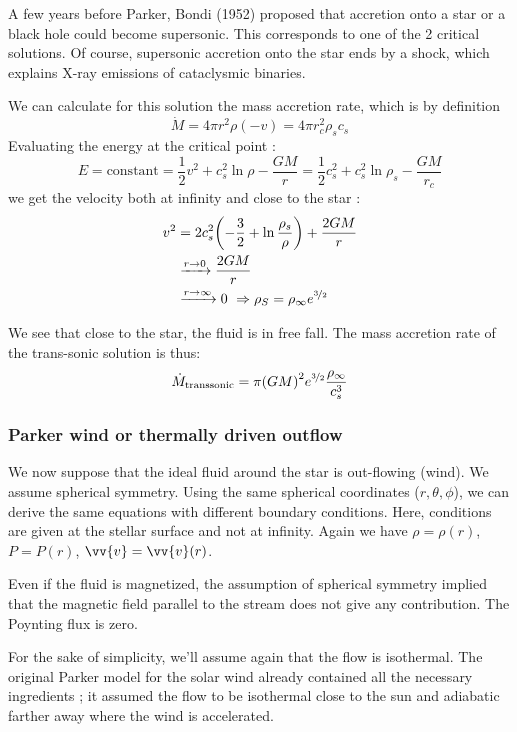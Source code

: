 \documentclass[10pt,a4paper,english]{article}
\let\originalleft\left
\let\originalright\right
\renewcommand{\left}{\mathopen{}\mathclose\bgroup\originalleft}
\renewcommand{\right}{\aftergroup\egroup\originalright}
\begin{document}
A few years before Parker, Bondi (1952) proposed that accretion onto a
star or a black hole could become supersonic. This corresponds to one
of the 2 critical solutions. Of course, supersonic accretion onto the
star ends by a shock, which explains X-ray emissions of cataclysmic
binaries.

We can calculate for this solution the mass accretion rate, which is
by definition
\begin{equation}
  \dot{M} = 4\pi r^2 \rho (-v) = 4\pi r_c^2 \rho_s c_s
\end{equation}
Evaluating the energy at the critical point :
\begin{equation}
  E = \textrm{constant} = \frac{1}{2}v^2 + c_s^2 \ln\rho - \frac{GM}{r} = \frac{1}{2}c_s^2 + c_s^2 \ln \rho_s - \frac{GM}{r_c}
\end{equation}
we get the velocity both at infinity and close to the star :
\begin{align}
  v^2 &= 2c_s^2 \left( -\frac{3}{2} + \ln \frac{\rho_s}{\rho} \right)  + \frac{2GM}{r} \\
      & \xrightarrow{r\to 0} \frac{2GM}{r} \\
      & \xrightarrow{r\to\infty} 0\ \Rightarrow \rho_S = \rho_\infty e^{\nicefrac{3}{2}}
\end{align}

We see that close to the star, the fluid is in free fall. The mass
accretion rate of the trans-sonic solution is thus:
\begin{equation}
  \dot{M}_\mathrm{transsonic} = \pi \left( GM \right)^2 e^{\nicefrac{3}{2}} \frac{\rho_\infty}{c_s^3}
\end{equation}
\subsubsection{Parker wind or thermally driven outflow}
We now suppose that the ideal fluid around the star is out-flowing (wind). We assume spherical symmetry. Using the same spherical coordinates ($r, \theta, \phi$), we can derive the same equations with different boundary conditions. Here, conditions are given at the stellar surface and not at infinity. Again we have $\rho = \rho(r)$, $P = P(r)$, $\vv{v} = \vv{v}(r)$.

Even if the fluid is magnetized, the assumption of spherical symmetry implied that the magnetic field parallel to the stream does not give any contribution. The Poynting flux is zero.

For the sake of simplicity, we'll assume again that the flow is isothermal. The original Parker model for the solar wind already contained all the necessary ingredients ; it assumed the flow to be isothermal close to the sun and adiabatic farther away where the wind is accelerated.
\end{document}
